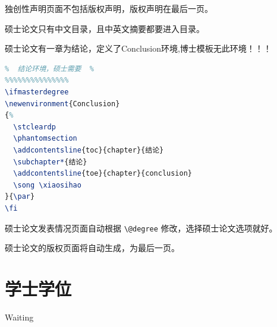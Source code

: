 独创性声明页面不包括版权声明，版权声明在最后一页。

硕士论文只有中文目录，且中英文摘要都要进入目录。

硕士论文有一章为结论，定义了Conclusion环境,博士模板无此环境！！！
\begin{lstlisting}[language=TeX]
%%%%%%%%%%%%%%%
%  结论环境，硕士需要  %
%%%%%%%%%%%%%%%
\ifmasterdegree
\newenvironment{Conclusion}
{%
  \stcleardp
  \phantomsection
  \addcontentsline{toc}{chapter}{结论}
  \subchapter*{结论}
  \addcontentsline{toe}{chapter}{conclusion}
  \song \xiaosihao
}{\par}
\fi
\end{lstlisting}

硕士论文发表情况页面自动根据 \lstinline|\@degree| 修改，选择硕士论文选项就好。

硕士论文的版权页面将自动生成，为最后一页。
\section{学士学位}
Waiting
